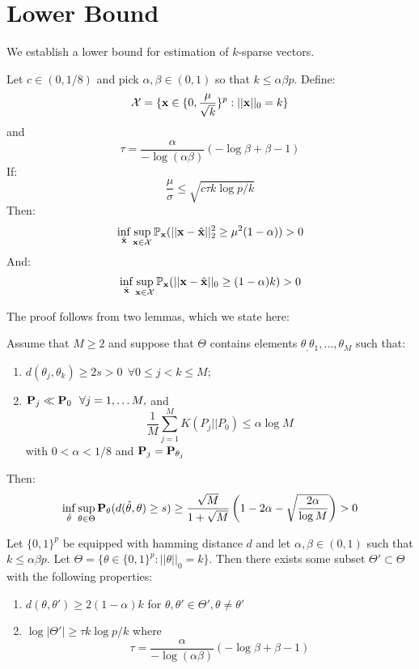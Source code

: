 \section{Lower Bound}

We establish a lower bound for estimation of $k$-sparse vectors.  

\begin{theorem}
Let $c \in (0, 1/8)$ and pick $\alpha, \beta \in (0,1)$ so that $k \le \alpha\beta p$. Define:
\[
\mathcal{X} = \{ \mathbf{x} \in \{0, \frac{\mu}{\sqrt{k}}\}^p : ||\mathbf{x}||_0 = k\}
\]
and
\[
\tau = \frac{\alpha}{- \log (\alpha \beta)}(-\log \beta + \beta - 1)
\]
If:
\[
\frac{\mu}{\sigma} \le \sqrt{ c \tau k \log p/k}
\]
Then:
\[
\inf_{\hat{\mathbf{x}}} \sup_{\mathbf{x} \in \mathcal{X}} \mathbb{P}_{\mathbf{x}}(||\mathbf{x} - \hat{\mathbf{x}}||_2^2 \ge \mu^2(1-\alpha)) > 0
\]
And:
\[
\inf_{\hat{\mathbf{x}}} \sup_{\mathbf{x} \in \mathcal{X}} \mathbb{P}_{\mathbf{x}}(||\mathbf{x} - \hat{\mathbf{x}}||_0 \ge (1-\alpha)k) > 0
\]
\label{thm:lower}
\end{theorem}

The proof follows from two lemmas, which we state here:

\begin{theorem}
Assume that $M \ge 2$ and suppose that $\Theta$ contains elements $\theta_, \theta_1, \ldots, \theta_M$ such that:
\begin{enumerate}
\item $d(\theta_j, \theta_k) \ge 2s > 0 \ \  \forall 0 \le j < k \le M$;
\item $\mathbf{P}_j \ll \mathbf{P}_0 \ \ \forall j=1, \ldots M,$ and
\[
\frac{1}{M} \sum_{j=1}^M K(P_j || P_0) \le \alpha \log M
\]
with $0 < \alpha < 1/8$ and $\mathbf{P}_j = \mathbf{P}_{\theta_j}$
\end{enumerate}
Then:
\[
\inf_{\hat{\theta}} \sup_{\theta \in \Theta} \mathbf{P}_{\theta}(d(\hat{\theta}, \theta) \ge s) \ge \frac{\sqrt{M}}{1+\sqrt{M}} \left(1 - 2\alpha - \sqrt{\frac{2\alpha}{\log M}}\right) > 0
\]
\label{thm:fano}
\end{theorem}

\begin{lemma}
Let $\{0,1\}^p$ be equipped with hamming distance $d$ and let $\alpha, \beta \in (0,1)$ such that $k \le \alpha \beta p$. 
Let $\Theta = \{ \theta \in \{0,1\}^p : ||\theta||_0 = k\}$.
Then there exists some subset $\Theta' \subset \Theta$ with the following properties:
\begin{enumerate}
\item $d(\theta, \theta') \ge 2 (1-\alpha)k$ for $\theta, \theta' \in \Theta', \theta \ne \theta'$
\item $\log |\Theta'| \ge \tau k \log p/k$ where
\[
\tau = \frac{\alpha}{- \log (\alpha \beta)}(-\log \beta + \beta - 1)
\]
\end{enumerate}
\label{lem:massart}
\end{lemma}

